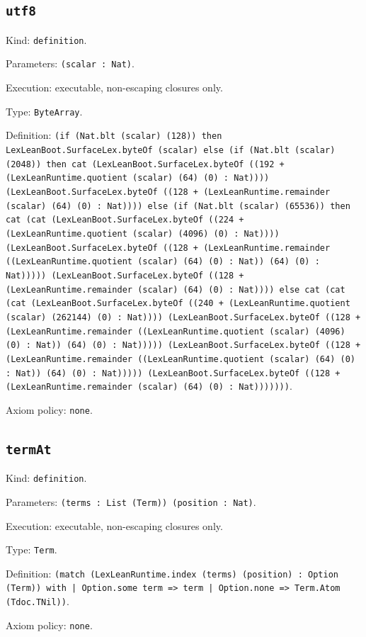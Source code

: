 \documentclass[11pt]{article}
\begin{document}
\subsection*{\texttt{utf8}}
\noindent Kind: \texttt{definition}.\par
\noindent Parameters: \texttt{(scalar : Nat)}.\par
\noindent Execution: executable, non-escaping closures only.\par
\noindent Type: \texttt{ByteArray}.\par
\noindent Definition: \texttt{(if (Nat.blt (scalar) (128)) then LexLeanBoot.SurfaceLex.byteOf (scalar) else (if (Nat.blt (scalar) (2048)) then cat (LexLeanBoot.SurfaceLex.byteOf ((192 + (LexLeanRuntime.quotient (scalar) (64) (0) : Nat)))) (LexLeanBoot.SurfaceLex.byteOf ((128 + (LexLeanRuntime.remainder (scalar) (64) (0) : Nat)))) else (if (Nat.blt (scalar) (65536)) then cat (cat (LexLeanBoot.SurfaceLex.byteOf ((224 + (LexLeanRuntime.quotient (scalar) (4096) (0) : Nat)))) (LexLeanBoot.SurfaceLex.byteOf ((128 + (LexLeanRuntime.remainder ((LexLeanRuntime.quotient (scalar) (64) (0) : Nat)) (64) (0) : Nat))))) (LexLeanBoot.SurfaceLex.byteOf ((128 + (LexLeanRuntime.remainder (scalar) (64) (0) : Nat)))) else cat (cat (cat (LexLeanBoot.SurfaceLex.byteOf ((240 + (LexLeanRuntime.quotient (scalar) (262144) (0) : Nat)))) (LexLeanBoot.SurfaceLex.byteOf ((128 + (LexLeanRuntime.remainder ((LexLeanRuntime.quotient (scalar) (4096) (0) : Nat)) (64) (0) : Nat))))) (LexLeanBoot.SurfaceLex.byteOf ((128 + (LexLeanRuntime.remainder ((LexLeanRuntime.quotient (scalar) (64) (0) : Nat)) (64) (0) : Nat))))) (LexLeanBoot.SurfaceLex.byteOf ((128 + (LexLeanRuntime.remainder (scalar) (64) (0) : Nat)))))))}.\par
\noindent Axiom policy: \texttt{none}.\par
\subsection*{\texttt{termAt}}
\noindent Kind: \texttt{definition}.\par
\noindent Parameters: \texttt{(terms : List (Term)) (position : Nat)}.\par
\noindent Execution: executable, non-escaping closures only.\par
\noindent Type: \texttt{Term}.\par
\noindent Definition: \texttt{(match (LexLeanRuntime.index (terms) (position) : Option (Term)) with | Option.some term => term | Option.none => Term.Atom (Tdoc.TNil))}.\par
\noindent Axiom policy: \texttt{none}.\par
\end{document}
